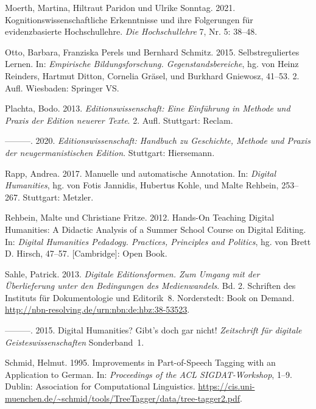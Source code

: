 \documentclass[
          a4paper,
        ]{article}
\newlength{\cslhangindent}
\newenvironment{CSLReferences}[2] %
 {\begin{list}{}{%
  \setlength{\itemindent}{0pt}
  \setlength{\leftmargin}{0pt}
  \setlength{\parsep}{0pt}
  \ifodd #1
   \setlength{\leftmargin}{\cslhangindent}
   \setlength{\itemindent}{-1\cslhangindent}
  \fi
  \setlength{\itemsep}{#2\baselineskip}}}
 {\end{list}}
\begin{document}
\begin{CSLReferences}{1}{0}
Moerth, Martina, Hiltraut Paridon und Ulrike Sonntag. 2021.
Kognitionswissenschaftliche Erkenntnisse und ihre Folgerungen für
evidenzbasierte Hochschullehre. \emph{Die Hochschullehre} 7, Nr. 5:
38--48.

Otto, Barbara, Franziska Perels und Bernhard Schmitz. 2015.
Selbstreguliertes Lernen. In: \emph{Empirische Bildungsforschung.
Gegenstandsbereiche}, hg. von Heinz Reinders, Hartmut Ditton, Cornelia
Gräsel, und Burkhard Gniewosz, 41--53. 2. Aufl. Wiesbaden: Springer VS.

Plachta, Bodo. 2013. \emph{Editionswissenschaft: Eine Einführung in
Methode und Praxis der Edition neuerer Texte}. 2. Aufl. Stuttgart:
Reclam.

---------. 2020. \emph{Editionswissenschaft: Handbuch zu Geschichte,
Methode und Praxis der neugermanistischen Edition}. Stuttgart:
Hiersemann.

Rapp, Andrea. 2017. Manuelle und automatische Annotation. In:
\emph{Digital Humanities}, hg. von Fotis Jannidis, Hubertus Kohle, und
Malte Rehbein, 253--267. Stuttgart: Metzler.

Rehbein, Malte und Christiane Fritze. 2012. Hands-On Teaching Digital
Humanities: A Didactic Analysis of a Summer School Course on Digital
Editing. In: \emph{Digital Humanities Pedadogy. Practices, Principles
and Politics}, hg. von Brett D. Hirsch, 47--57. {[}Cambridge{]}: Open
Book.

Sahle, Patrick. 2013. \emph{Digitale Editionsformen. Zum Umgang mit der
Überlieferung unter den Bedingungen des Medienwandels}. Bd. 2. Schriften
des Instituts für Dokumentologie und Editorik~8. Norderstedt: Book on
Demand. \url{http://nbn-resolving.de/urn:nbn:de:hbz:38-53523}.

---------. 2015. Digital Humanities? Gibt's doch gar nicht!
\emph{Zeitschrift für digitale Geisteswissenschaften} Sonderband~1.

Schmid, Helmut. 1995. Improvements in Part-of-Speech Tagging with an
Application to German. In: \emph{Proceedings of the ACL
SIGDAT-Workshop}, 1--9. Dublin: Association for Computational
Linguistics.
\url{https://cis.uni-muenchen.de/~schmid/tools/TreeTagger/data/tree-tagger2.pdf}.


\end{CSLReferences}
\end{document}
